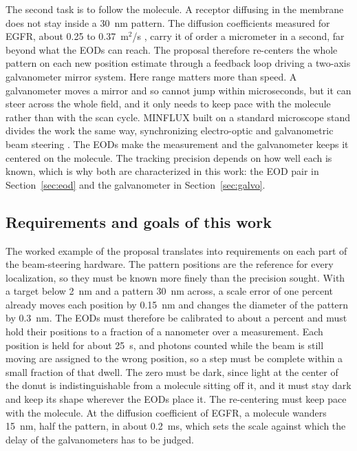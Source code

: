 \documentclass{article}
\begin{document}
The second task is to follow the molecule. A receptor diffusing in the membrane does not stay
inside a 30~nm pattern. The diffusion coefficients measured for EGFR, about 0.25 to
0.37~\textmu m$^2$/s \cite{becerraQuantifyingProteinInteractions2024}, carry it of order a
micrometer in a second, far beyond what the EODs can reach. The proposal therefore
re-centers the whole pattern on each new position estimate through a feedback loop driving a
two-axis galvanometer mirror system. Here range matters more than speed. A galvanometer moves a
mirror and so cannot jump within microseconds, but it can steer across the whole field, and it only
needs to keep pace with the molecule rather than with the scan cycle. MINFLUX built on a standard
microscope stand divides the work the same way, synchronizing electro-optic and galvanometric beam
steering
\cite{schmidtMINFLUXNanometerscale3D2021}. The EODs make the measurement and the galvanometer
keeps it centered on the molecule. The tracking precision depends on how well each is known, which
is why both are characterized in this work: the EOD pair in Section~\ref{sec:eod} and the
galvanometer in Section~\ref{sec:galvo}.
\subsection{Requirements and goals of this work}
\label{sec:goals}

The worked example of the proposal translates into requirements on each part of the beam-steering
hardware. The pattern positions are the reference for every localization, so they must be known
more finely than the precision sought. With a target below 2~nm and a pattern 30~nm across, a
scale error of one percent already moves each position by 0.15~nm and changes the diameter of the
pattern by 0.3~nm. The EODs must therefore be
calibrated to about a percent and must hold their positions to a fraction of a nanometer over a
measurement. Each position is held for about 25~\textmu s, and photons counted while the beam is
still moving are assigned to the wrong position, so a step must be complete within a small
fraction of that dwell. The zero must be dark, since light at the center of the donut is
indistinguishable from a molecule sitting off it, and it must stay dark and keep its shape wherever
the EODs place it. The re-centering must keep pace with the molecule. At the diffusion
coefficient of EGFR, a molecule wanders 15~nm, half the pattern, in about 0.2~ms, which sets the
scale against which the delay of the galvanometers has to be judged.
\end{document}
